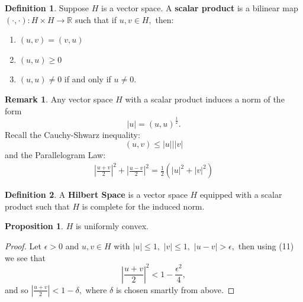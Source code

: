 \documentclass[10pt, oneside]{article}
\newcommand{\bbR}{\mathbb{R}}
\theoremstyle{definition}
\newtheorem{defn}{Definition}
\newtheorem{prop}{Proposition}
\newtheorem{rem}{Remark}
\begin{document}
\begin{defn}
    Suppose $H$ is a vector space. A \textbf{scalar product} is a bilinear map $(\cdot,\cdot): H\times H \to \bbR$ such that if $u, v\in H,$ then:
    \begin{enumerate}
        \item $(u,v) = (v,u)$
        \item $(u,u) \geq 0$
        \item $(u,u) \neq 0$ if and only if $u\neq 0.$
    \end{enumerate}
\end{defn}
\begin{rem}
    Any vector space $H$ with a scalar product induces a norm of the form 
    \[|u| = (u,u)^\frac{1}{2}.\] 
    Recall the Cauchy-Shwarz inequality:
    \[(u,v)\leq |u|||v|\] and the Parallelogram Law:
    \begin{align}
    |\frac{u + v}{2}|^2 + |\frac{u-v}{2}|^2 = \frac{1}{2}(|u|^2 + |v|^2)    
    \end{align}
    
\end{rem}

\begin{defn}
    A \textbf{Hilbert Space} is a vector space $H$ equipped with a scalar  product such that $H$ is complete for the induced norm.
\end{defn}

\begin{prop}
    $H$ is uniformly convex.
\end{prop}
\begin{proof}
    Let $\epsilon>0$ and $u,v \in H$ with $|u|\leq 1,$ $|v|\leq 1,$ $|u-v|>\epsilon,$ then using (11) we see that
    \[|\frac{u + v}{2}|^2 < 1- \frac{\epsilon^2}{4},\] and so $|\frac{u + v}{2}| < 1-\delta,$ where $\delta$ is chosen smartly from above.
\end{proof}
\end{document}
